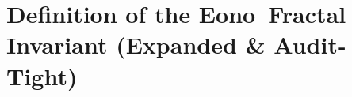 
\section{Definition of the Eono–Fractal Invariant (Expanded \& Audit-Tight)}
\label{sec:def-invariant}

